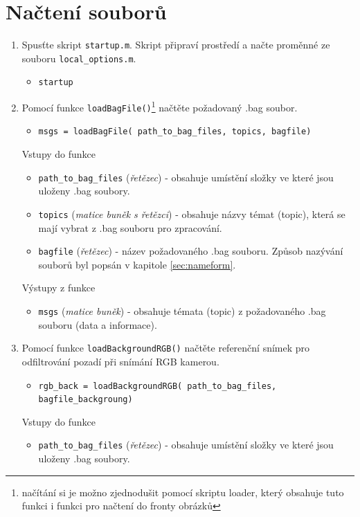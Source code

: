 \documentclass[10pt,a4paper,titlepage,oneside]{report}
\begin{document}
\section{Načtení souborů}
\begin{enumerate}
  \item Spusťte skript \verb|startup.m|. Skript připraví prostředí a načte proměnné ze souboru \verb|local_options.m|.
    \begin{itemize}
  	\item \verb|startup|
  \end{itemize}
  \item Pomocí funkce \verb|loadBagFile()|\footnote{načítání si je možno zjednodušit pomocí skriptu loader, který obsahuje tuto funkci i funkci pro načtení do fronty obrázků} načtěte požadovaný .bag soubor.
	\label{itm:load1}    
    \begin{itemize}
  	\item \verb|msgs = loadBagFile( path_to_bag_files, topics, bagfile)|
    \end{itemize}
    		Vstupy do funkce
        		\begin{itemize}
  			\item \verb|path_to_bag_files| (\textit{řetězec}) - obsahuje umístění složky ve které jsou uloženy .bag soubory.
  			\item \verb|topics| (\textit{matice buněk s řetězci}) - obsahuje názvy témat (topic), která se mají vybrat z .bag souboru pro zpracování.
  			\item \verb|bagfile| (\textit{řetězec}) - název požadovaného .bag souboru. Způsob nazývání souborů byl popsán v kapitole \ref{sec:nameform}.
    			\end{itemize}
    		Výstupy z funkce
        		\begin{itemize}
  			\item \verb|msgs| (\textit{matice buněk}) - obsahuje témata (topic) z požadovaného .bag souboru (data a informace).
    			\end{itemize}
    \item Pomocí funkce \verb|loadBackgroundRGB()| načtěte referenční snímek pro odfiltrování pozadí při snímání RGB kamerou.
	\label{itm:load2} 
    \begin{itemize}
  	\item \verb|rgb_back = loadBackgroundRGB( path_to_bag_files, bagfile_backgroung)|
    \end{itemize}
    		Vstupy do funkce
        		\begin{itemize}
  			\item \verb|path_to_bag_files| (\textit{řetězec}) - obsahuje umístění složky ve které jsou uloženy .bag soubory.

\end{itemize}
\end{enumerate}
\end{document}
